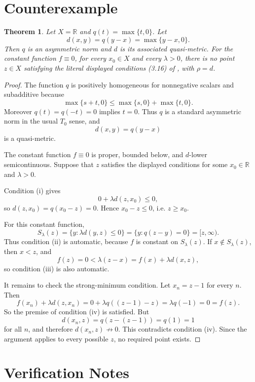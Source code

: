 \documentclass[11pt]{article}
\newtheorem{theorem}{Theorem}
\begin{document}
\section*{Counterexample}

\begin{theorem}
Let \(X=\mathbb R\) and \(q(t)=\max\{t,0\}\).  Let
\[
  d(x,y)=q(y-x)=\max\{y-x,0\}.
\]
Then \(q\) is an asymmetric norm and \(d\) is its associated quasi-metric.
For the constant function \(f\equiv 0\), for every \(x_0\in X\) and every
\(\lambda>0\), there is no point \(z\in X\) satisfying the literal displayed
conditions (3.16) of \cite{Cobzas2024}, with \(\rho=d\).
\end{theorem}

\begin{proof}
The function \(q\) is positively homogeneous for nonnegative scalars and
subadditive because
\[
  \max\{s+t,0\}\le \max\{s,0\}+\max\{t,0\}.
\]
Moreover \(q(t)=q(-t)=0\) implies \(t=0\).  Thus \(q\) is a standard
asymmetric norm in the usual \(T_0\) sense, and
\[
  d(x,y)=q(y-x)
\]
is a quasi-metric.

The constant function \(f\equiv 0\) is proper, bounded below, and
\(d\)-lower semicontinuous.  Suppose that \(z\) satisfies the displayed
conditions for some \(x_0\in\mathbb R\) and \(\lambda>0\).

Condition (i) gives
\[
  0+\lambda d(z,x_0)\le 0,
\]
so \(d(z,x_0)=q(x_0-z)=0\).  Hence \(x_0-z\le 0\), i.e. \(z\ge x_0\).

For this constant function,
\[
  S_\lambda(z)=\{y:\lambda d(y,z)\le 0\}
             =\{y:q(z-y)=0\}
             =[z,\infty).
\]
Thus condition (ii) is automatic, because \(f\) is constant on
\(S_\lambda(z)\).  If \(x\notin S_\lambda(z)\), then \(x<z\), and
\[
  f(z)=0<\lambda(z-x)=f(x)+\lambda d(x,z),
\]
so condition (iii) is also automatic.

It remains to check the strong-minimum condition.  Let \(x_n=z-1\) for every
\(n\).  Then
\[
  f(x_n)+\lambda d(z,x_n)
  =0+\lambda q((z-1)-z)
  =\lambda q(-1)
  =0
  =f(z).
\]
So the premise of condition (iv) is satisfied.  But
\[
  d(x_n,z)=q(z-(z-1))=q(1)=1
\]
for all \(n\), and therefore \(d(x_n,z)\not\to 0\).  This contradicts
condition (iv).  Since the argument applies to every possible \(z\), no
required point exists.
\end{proof}

\section*{Verification Notes}
\end{document}
